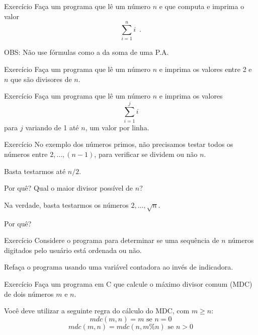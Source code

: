 \documentclass[handout]{beamer}
\begin{document}
\begin{frame}[fragile]{Exercício}
    Faça um programa que lê um número $n$ e que computa e imprima o valor 
    $$\sum_{i=1}^n i \enspace.$$
    
    OBS: Não use fórmulas como a da soma de uma P.A.
\end{frame}

\begin{frame}[fragile]{Exercício}
    Faça um programa que lê um número $n$ e imprima os valores entre 2 e $n$ que são divisores de $n$.
\end{frame}

\begin{frame}[fragile]{Exercício}
    Faça um programa que lê um número $n$ e imprima os valores 
    $$\sum_{i=1}^j i$$
    para $j$ variando de 1 até $n$, um valor por linha.
\end{frame}

\begin{frame}[fragile]{Exercício}
    No exemplo dos números primos, não precisamos testar todos os números entre $2, \ldots, (n-1)$, para verificar se dividem ou não $n$.
    
    Basta testarmos até $n/2$.
    
    Por quê? Qual o maior divisor possível de $n$?

    Na verdade, basta testarmos os números $2,\ldots, \sqrt{n}$.
    
    Por quê?
\end{frame}

\begin{frame}[fragile]{Exercício}
    Considere o programa para determinar se uma sequência de $n$ números digitados pelo usuário está ordenada ou não.
    
    Refaça o programa usando uma variável contadora ao invés de indicadora.
\end{frame}

\begin{frame}[fragile]{Exercício}
    Faça um programa em C que calcule o máximo divisor comum (MDC) de dois números $m$ e $n$.
    
    Você deve utilizar a seguinte regra do cálculo do MDC, com $m \geq n$:
    $$mdc(m,n) = m \mbox{ se } n=0$$
    $$mdc(m,n) = mdc(n,m\%n) \mbox{ se } n>0$$
\end{frame}
\end{document}
